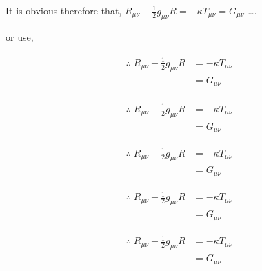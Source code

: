 \documentclass[11pt,a4paper]{article}
\begin{document}
It is obvious therefore that, $R_{\mu \nu} -\frac{1}{2}g_{\mu \nu} R = -\kappa   T_{\mu \nu} = G_{\mu \nu} $ \ldots.

or use,

\begin{gather}
\begin{aligned}
\therefore \;R_{\mu \nu} -\frac{1}{2}g_{\mu \nu} R &= -\kappa        T_{\mu \nu}\\
& = G_{\mu \nu} 
\end{aligned}
\end{gather}

\begin{equation}
\begin{aligned}
\therefore \;R_{\mu \nu} -\frac{1}{2}g_{\mu \nu} R &= -\kappa        T_{\mu \nu}\\
& = G_{\mu \nu} 
\end{aligned}
\end{equation}



\begin{align}
\therefore \;R_{\mu \nu} -\frac{1}{2}g_{\mu \nu} R &= -\kappa        T_{\mu \nu}\\
& = G_{\mu \nu} 
\end{align}

\[
\begin{aligned}
\therefore \;R_{\mu \nu} -\frac{1}{2}g_{\mu \nu} R &= -\kappa        T_{\mu \nu}\\
& = G_{\mu \nu} 
\end{aligned}
\]

\begin{align*}
\therefore \;R_{\mu \nu} -\frac{1}{2}g_{\mu \nu} R &= -\kappa        T_{\mu \nu}\\
& = G_{\mu \nu} 
\end{align*}
\end{document}
